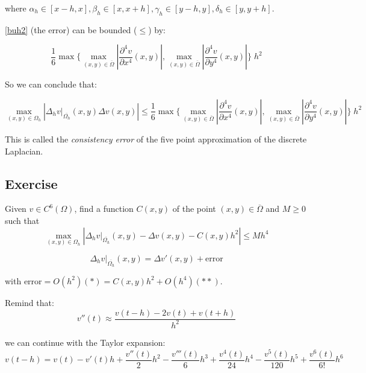 where $\alpha_h \in [x-h, x], \beta_h \in [x, x+h], \gamma_h \in [y-h, y], \delta_h \in [y, y+h]$.

\ref{buh2} (the error) can be bounded ($\leq$) by:

\begin{equation}
\frac{1}{6} \max\{ \max_{(x, y) \in \overline{\Omega}} |\frac{\partial^4 v}{\partial x^4} (x, y)|, \max_{(x, y) \in \overline{\Omega}} |\frac{\partial^4 v}{\partial y^4} (x, y)| \} \; h^2
\end{equation}

So we can conclude that:

\begin{equation}
\max_{(x,y) \in \Omega_h}  |\Delta_h v {|}_{\overline{\Omega_h}} (x,y) \Delta v(x,y)| \leq \frac{1}{6} \max\{ \max_{(x, y) \in \overline{\Omega}} |\frac{\partial^4 v}{\partial x^4} (x, y)|, \max_{(x, y) \in \overline{\Omega}} |\frac{\partial^4 v}{\partial y^4} (x, y)| \} \; h^2
\end{equation}


This is called the \textit{consistency error} of the five point approximation of the discrete Laplacian.

\subsection{Exercise}

Given $v \in C^6(\Omega)$, find  a function $C(x,y)$ of the point $(x, y) \in \overline{\Omega}$ and $M \ge 0$ such that 
\begin{equation*}
\max_{(x,y) \in \Omega_h}  |\Delta_h v {|}_{\overline{\Omega_h}} (x,y) - \Delta v(x,y) - C(x, y) h^2| \le M h^4
\end{equation*}

\begin{equation*}
\Delta_h v {|}_{\overline{\Omega_h}} (x,y) = \Delta v'(x,y) + \text{error}
\end{equation*}

with $\text{error} = O(h^2)(*) = C(x, y) h^2 + O(h^4) (**)$.


Remind that:
\begin{equation}
v''(t) \approx \frac{v(t - h) - 2 v(t) + v(t + h)}{h^2}
\end{equation}

we can continue with the Taylor expansion:
\begin{equation*}
v(t-h) = v(t) - v'(t) h + \frac{v''(t)}{2} h^2 - \frac{v'''(t)}{6} h^3 + \frac{v^{4}(t)}{24} h^4  - \frac{v^{5}(t)}{120} h^5 + \frac{v^{6}(t)}{6!} h^6
\end{equation*}

